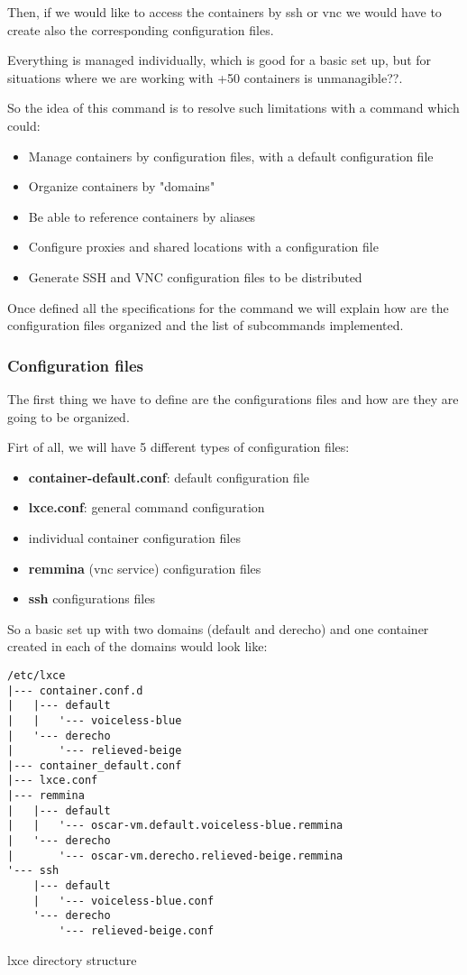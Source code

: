 Then, if we would like to access the containers by ssh or vnc we would have to create also the corresponding configuration files.

Everything is managed individually, which is good for a basic set up, but for situations where we are working with +50 containers is unmanagible??. 

So the idea of this command is to resolve such limitations with a command which could:
\begin{itemize}
	\item{Manage containers by configuration files, with a default configuration file}
	\item{Organize containers by "domains"}
	\item{Be able to reference containers by aliases}
	\item{Configure proxies and shared locations with a configuration file}
	\item{Generate SSH and VNC configuration files to be distributed}
\end{itemize}

Once defined all the specifications for the command we will explain how are the configuration files organized and the list of subcommands implemented.

\subsubsection{Configuration files}
The first thing we have to define are the configurations files and how are they are going to be organized.

Firt of all, we will have 5 different types of configuration files:
\begin{itemize}
	\item{\textbf{container-default.conf}: default configuration file}
	\item{\textbf{lxce.conf}: general command configuration}
	\item{individual container configuration files}
	\item{\textbf{remmina} (vnc service) configuration files}
	\item{\textbf{ssh} configurations files}
\end{itemize}

So a basic set up with two domains (default and derecho) and one container created in each of the domains would look like:

\begin{listing}[H]
\begin{verbatim}
/etc/lxce 
|--- container.conf.d 			
|   |--- default 			
|   |   '--- voiceless-blue
|   '--- derecho 			
|       '--- relieved-beige
|--- container_default.conf 		
|--- lxce.conf 			
|--- remmina 		
|   |--- default 
|   |   '--- oscar-vm.default.voiceless-blue.remmina
|   '--- derecho 
|       '--- oscar-vm.derecho.relieved-beige.remmina
'--- ssh 	
    |--- default 
    |   '--- voiceless-blue.conf
    '--- derecho
        '--- relieved-beige.conf
\end{verbatim}
\caption{lxce directory structure}
\label{listings: lxce directory structure /etc/lxce}
\end{listing}

